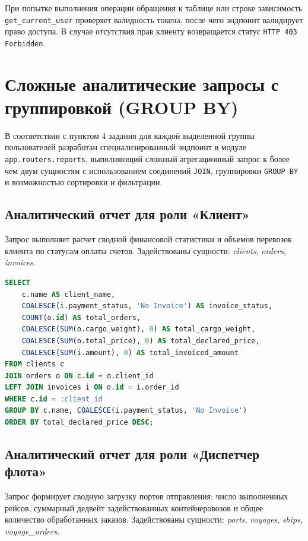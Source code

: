 \documentclass[a4paper,14pt]{article}
\begin{document}
При попытке выполнения операции обращения к таблице или строке зависимость \texttt{get\_current\_user} проверяет валидность токена, после чего эндпоинт валидирует право доступа. В случае отсутствия прав клиенту возвращается статус \texttt{HTTP 403 Forbidden}.

\section{Сложные аналитические запросы с группировкой (GROUP BY)}

В соответствии с пунктом 4 задания для каждой выделенной группы пользователей разработан специализированный эндпоинт в модуле \texttt{app.routers.reports}, выполняющий сложный агрегационный запрос к более чем двум сущностям с использованием соединений \texttt{JOIN}, группировки \texttt{GROUP BY} и возможностью сортировки и фильтрации.

\subsection{Аналитический отчет для роли «Клиент»}
Запрос выполняет расчет сводной финансовой статистики и объемов перевозок клиента по статусам оплаты счетов. Задействованы сущности: \textit{clients}, \textit{orders}, \textit{invoices}.

\begin{lstlisting}[language=SQL]
SELECT 
    c.name AS client_name,
    COALESCE(i.payment_status, 'No Invoice') AS invoice_status,
    COUNT(o.id) AS total_orders,
    COALESCE(SUM(o.cargo_weight), 0) AS total_cargo_weight,
    COALESCE(SUM(o.total_price), 0) AS total_declared_price,
    COALESCE(SUM(i.amount), 0) AS total_invoiced_amount
FROM clients c
JOIN orders o ON c.id = o.client_id
LEFT JOIN invoices i ON o.id = i.order_id
WHERE c.id = :client_id
GROUP BY c.name, COALESCE(i.payment_status, 'No Invoice')
ORDER BY total_declared_price DESC;
\end{lstlisting}

\subsection{Аналитический отчет для роли «Диспетчер флота»}
Запрос формирует сводную загрузку портов отправления: число выполненных рейсов, суммарный дедвейт задействованных контейнеровозов и общее количество обработанных заказов. Задействованы сущности: \textit{ports}, \textit{voyages}, \textit{ships}, \textit{voyage\_orders}.
\end{document}
